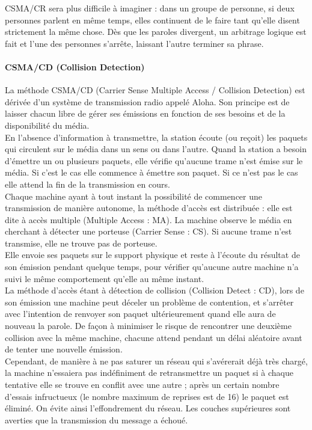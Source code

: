 \documentclass[11pt, a4paper, twoside]{book}
\begin{document}
CSMA/CR sera plus difficile à imaginer : dans un groupe de personne, si deux personnes parlent en même temps, elles continuent de le faire tant qu'elle disent strictement la même chose. Dès que les paroles divergent, un arbitrage logique est fait et l'une des personnes s'arrête, laissant l'autre terminer sa phrase.

\paragraph*{CSMA/CD (Collision Detection)}
La méthode CSMA/CD (Carrier Sense Multiple Access / Collision Detection) est dérivée d'un système de transmission radio appelé Aloha. Son principe est de laisser chacun libre de gérer ses émissions en fonction de ses besoins et de la disponibilité du média.\\

En l'absence d'information à transmettre, la station écoute (ou reçoit) les paquets qui circulent sur le média dans un sens ou dans l'autre. Quand la station a besoin d'émettre un ou plusieurs paquets, elle vérifie qu'aucune trame n'est émise sur le média. Si c'est le cas elle commence à émettre son paquet. Si ce n'est pas le cas elle attend la fin de la transmission en cours. \\

Chaque machine ayant à tout instant la possibilité de commencer une transmission de manière autonome, la méthode d'accès est distribuée : elle est dite à accès multiple (Multiple Access : MA). La machine observe le média en cherchant à détecter une porteuse (Carrier Sense : CS). Si aucune trame n'est transmise, elle ne trouve pas de porteuse.\\

Elle envoie ses paquets sur le support physique et reste à l'écoute du résultat de son émission pendant quelque temps, pour vérifier qu'aucune autre machine n'a suivi le même comportement qu'elle au même instant.\\

La méthode d'accès étant à détection de collision (Collision Detect : CD), lors de son émission une machine peut déceler un problème de contention, et s'arrêter avec l'intention de renvoyer son paquet ultérieurement quand elle aura de nouveau la parole. De façon à minimiser le risque de rencontrer une deuxième collision avec la même machine, chacune attend pendant un délai aléatoire avant de tenter une nouvelle émission.\\

Cependant, de manière à ne pas saturer un réseau qui s'avérerait déjà très chargé, la machine n'essaiera pas indéfiniment de retransmettre un paquet si à chaque tentative elle se trouve en conflit avec une autre ; après un certain nombre d'essais infructueux (le nombre maximum de reprises est de 16) le paquet est éliminé. On évite ainsi l'effondrement du réseau. Les couches supérieures sont averties que la transmission du message a échoué.
\end{document}
